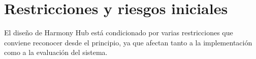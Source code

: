 \begin{table}[H]
\centering
\scriptsize
\renewcommand{\arraystretch}{1.1}
\setlength{\tabcolsep}{2.8pt}
\caption{Matriz de trazabilidad centrada en casos de uso y requisitos.}
\label{tab:matriz_trazabilidad}
\end{table}

\section{Restricciones y riesgos iniciales}
\label{sec:restricciones_riesgos}

El diseño de Harmony Hub está condicionado por varias restricciones que conviene reconocer desde el principio, ya que afectan tanto a la implementación como a la evaluación del sistema.

